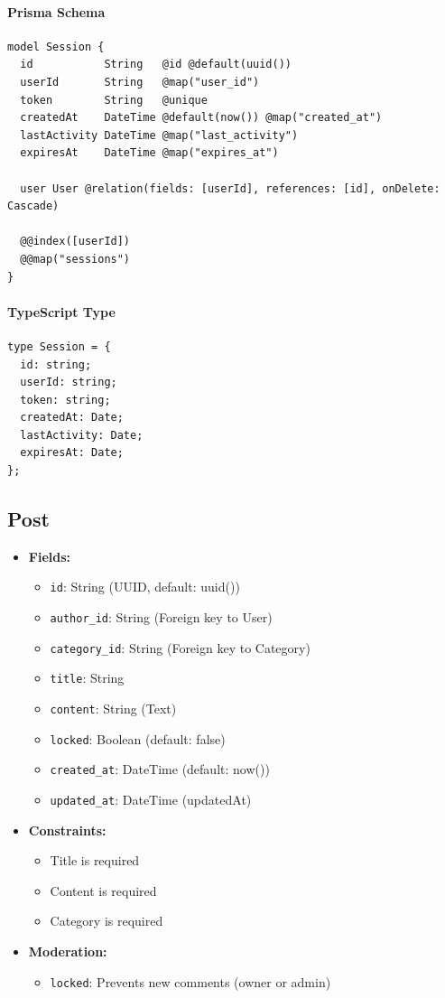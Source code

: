 \documentclass[11pt,a4paper]{article}
\begin{document}
\paragraph{Prisma Schema}
\begin{lstlisting}
model Session {
  id           String   @id @default(uuid())
  userId       String   @map("user_id")
  token        String   @unique
  createdAt    DateTime @default(now()) @map("created_at")
  lastActivity DateTime @map("last_activity")
  expiresAt    DateTime @map("expires_at")
  
  user User @relation(fields: [userId], references: [id], onDelete: Cascade)
  
  @@index([userId])
  @@map("sessions")
}
\end{lstlisting}

\paragraph{TypeScript Type}
\begin{lstlisting}
type Session = {
  id: string;
  userId: string;
  token: string;
  createdAt: Date;
  lastActivity: Date;
  expiresAt: Date;
};
\end{lstlisting}

\subsection{Post}
\begin{itemize}
    \item \textbf{Fields:}
    \begin{itemize}
        \item \texttt{id}: String (UUID, default: uuid())
        \item \texttt{author\_id}: String (Foreign key to User)
        \item \texttt{category\_id}: String (Foreign key to Category)
        \item \texttt{title}: String
        \item \texttt{content}: String (Text)
        \item \texttt{locked}: Boolean (default: false)
        \item \texttt{created\_at}: DateTime (default: now())
        \item \texttt{updated\_at}: DateTime (updatedAt)
    \end{itemize}
    \item \textbf{Constraints:}
    \begin{itemize}
        \item Title is required
        \item Content is required
        \item Category is required
    \end{itemize}
    \item \textbf{Moderation:}
    \begin{itemize}
        \item \texttt{locked}: Prevents new comments (owner or admin)
    \end{itemize}
\end{itemize}
\end{document}
